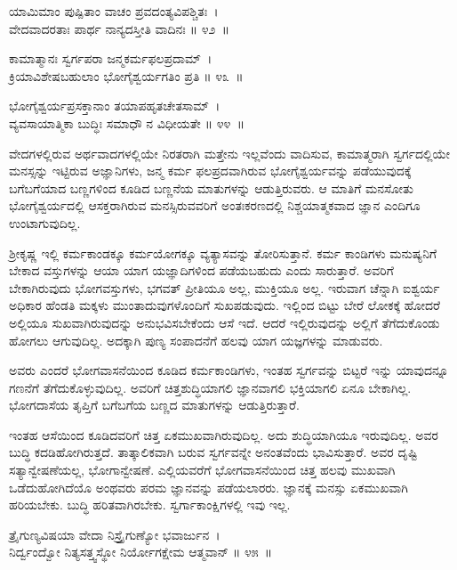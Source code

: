 \begin{shloka}
ಯಾಮಿಮಾಂ ಪುಷ್ಪಿತಾಂ ವಾಚಂ ಪ್ರವದಂತ್ಯವಿಪಶ್ಚಿತಃ~।\\ವೇದವಾದರತಾಃ ಪಾರ್ಥ ನಾನ್ಯದಸ್ತೀತಿ ವಾದಿನಃ \hfill॥ ೪೨~॥
\end{shloka}

\begin{shloka}
ಕಾಮಾತ್ಮಾನಃ ಸ್ವರ್ಗಪರಾ ಜನ್ಮಕರ್ಮಫಲಪ್ರದಾಮ್~।\\ಕ್ರಿಯಾವಿಶೇಷಬಹುಲಾಂ ಭೋಗೈಶ್ವರ್ಯಗತಿಂ ಪ್ರತಿ \hfill॥ ೪೩~॥
\end{shloka}

\begin{shloka}
ಭೋಗೈಶ್ವರ್ಯಪ್ರಸಕ್ತಾನಾಂ ತಯಾಪಹೃತಚೇತಸಾಮ್~।\\ವ್ಯವಸಾಯಾತ್ಮಿಕಾ ಬುದ್ಧಿಃ ಸಮಾಧೌ ನ ವಿಧೀಯತೇ \hfill॥ ೪೪~॥
\end{shloka}

\begin{artha}
ವೇದಗಳಲ್ಲಿರುವ ಅರ್ಥವಾದಗಳಲ್ಲಿಯೇ ನಿರತರಾಗಿ ಮತ್ತೇನು ಇಲ್ಲವೆಂದು ವಾದಿಸುವ, ಕಾಮಾತ್ಮರಾಗಿ ಸ್ವರ್ಗದಲ್ಲಿಯೇ ಮನಸ್ಸನ್ನು ಇಟ್ಟಿರುವ ಅಜ್ಞಾನಿಗಳು, ಜನ್ಮ ಕರ್ಮ ಫಲಪ್ರದವಾಗಿರುವ ಭೋಗೈಶ್ವರ್ಯವನ್ನು ಪಡೆಯುವುದಕ್ಕೆ ಬಗೆಬಗೆಯಾದ ಬಣ್ಣಗಳಿಂದ ಕೂಡಿದ ಬಣ್ಣನೆಯ ಮಾತುಗಳನ್ನು ಆಡುತ್ತಿರುವರು. ಆ ಮಾತಿಗೆ ಮನಸೋತು ಭೋಗೈಶ್ವರ್ಯದಲ್ಲಿ ಆಸಕ್ತರಾಗಿರುವ ಮನಸ್ಸಿರುವವರಿಗೆ ಅಂತಃಕರಣದಲ್ಲಿ ನಿಶ್ಚಯಾತ್ಮಕವಾದ ಜ್ಞಾನ ಎಂದಿಗೂ ಉಂಟಾಗುವುದಿಲ್ಲ.
\end{artha}

ಶ‍್ರೀಕೃಷ್ಣ ಇಲ್ಲಿ ಕರ್ಮಕಾಂಡಕ್ಕೂ ಕರ್ಮಯೋಗಕ್ಕೂ ವ್ಯತ್ಯಾಸವನ್ನು ತೋರಿಸುತ್ತಾನೆ. ಕರ್ಮ ಕಾಂಡಿಗಳು ಮನುಷ್ಯನಿಗೆ ಬೇಕಾದ ವಸ್ತುಗಳನ್ನು ಆಯಾ ಯಾಗ ಯಜ್ಞಾದಿಗಳಿಂದ ಪಡೆಯಬಹುದು ಎಂದು ಸಾರುತ್ತಾರೆ. ಅವರಿಗೆ ಬೇಕಾಗಿರುವುದು ಭೋಗವಸ್ತುಗಳು, ಭಗವತ್ ಪ್ರೀತಿಯೂ ಅಲ್ಲ, ಮುಕ್ತಿಯೂ ಅಲ್ಲ. ಇರುವಾಗ ಚೆನ್ನಾಗಿ ಐಶ್ವರ್ಯ ಅಧಿಕಾರ ಹೆಂಡತಿ ಮಕ್ಕಳು ಮುಂತಾದುವುಗಳೊಂದಿಗೆ ಸುಖಪಡುವುದು. ಇಲ್ಲಿಂದ ಬಿಟ್ಟು ಬೇರೆ ಲೋಕಕ್ಕೆ ಹೋದರೆ ಅಲ್ಲಿಯೂ ಸುಖವಾಗಿರುವುದನ್ನು ಅನುಭವಿಸಬೇಕೆಂದು ಆಸೆ ಇದೆ. ಆದರೆ ಇಲ್ಲಿರುವುದನ್ನು ಅಲ್ಲಿಗೆ ತೆಗೆದುಕೊಂಡು ಹೋಗಲು ಆಗುವುದಿಲ್ಲ. ಅದಕ್ಕಾಗಿ ಪುಣ್ಯ ಸಂಪಾದನೆಗೆ ಹಲವು ಯಾಗ ಯಜ್ಞಗಳನ್ನು ಮಾಡುವರು.

ಅವರು ಎಂದರೆ ಭೋಗವಾಸನೆಯಿಂದ ಕೂಡಿದ ಕರ್ಮಕಾಂಡಿಗಳು, ಇಂತಹ ಸ್ವರ್ಗವನ್ನು ಬಿಟ್ಟರೆ ಇನ್ನು ಯಾವುದನ್ನೂ ಗಣನೆಗೆ ತೆಗೆದುಕೊಳ್ಳುವುದಿಲ್ಲ. ಅವರಿಗೆ ಚಿತ್ತಶುದ್ಧಿಯಾಗಲಿ ಜ್ಞಾನವಾಗಲಿ ಭಕ್ತಿಯಾಗಲಿ ಏನೂ ಬೇಕಾಗಿಲ್ಲ. ಭೋಗದಾಸೆಯ ತೃಪ್ತಿಗೆ ಬಗೆಬಗೆಯ ಬಣ್ಣದ ಮಾತುಗಳನ್ನು ಆಡುತ್ತಿರುತ್ತಾರೆ.

ಇಂತಹ ಆಸೆಯಿಂದ ಕೂಡಿದವರಿಗೆ ಚಿತ್ತ ಏಕಮುಖವಾಗಿರುವುದಿಲ್ಲ. ಅದು ಶುದ್ಧಿಯಾಗಿಯೂ ಇರುವುದಿಲ್ಲ. ಅವರ ಬುದ್ಧಿ ಕದಡಿಹೋಗಿರುತ್ತದೆ. ತಾತ್ಕಾಲಿಕವಾಗಿ ಬರುವ ಸ್ವರ್ಗವನ್ನೇ ಅನಂತವೆಂದು ಭಾವಿಸುತ್ತಾರೆ. ಅವರ ದೃಷ್ಟಿ ಸತ್ಯಾನ್ವೇಷಣೆಯಲ್ಲ, ಭೋಗಾನ್ವೇಷಣೆ. ಎಲ್ಲಿಯವರೆಗೆ ಭೋಗವಾಸನೆಯಿಂದ ಚಿತ್ತ ಹಲವು ಮುಖವಾಗಿ ಒಡೆದುಹೋಗಿದೆಯೊ ಅಂಥವರು ಪರಮ ಜ್ಞಾನವನ್ನು ಪಡೆಯಲಾರರು. ಜ್ಞಾನಕ್ಕೆ ಮನಸ್ಸು ಏಕಮುಖವಾಗಿ ಹರಿಯಬೇಕು. ಬುದ್ಧಿ ಹರಿತವಾಗಿರಬೇಕು. ಸ್ವರ್ಗಾಕಾಂಕ್ಷಿಗಳಲ್ಲಿ ಇವು ಇಲ್ಲ.

\begin{shloka}
ತ್ರೈಗುಣ್ಯವಿಷಯಾ ವೇದಾ ನಿಸ್ತ್ರೈಗುಣ್ಯೋ ಭವಾರ್ಜುನ~।\\ನಿರ್ದ್ವಂದ್ವೋ ನಿತ್ಯಸತ್ತ್ವಸ್ಥೋ ನಿರ್ಯೋಗಕ್ಷೇಮ ಆತ್ಮವಾನ್ \hfill॥ ೪೫~॥
\end{shloka}

